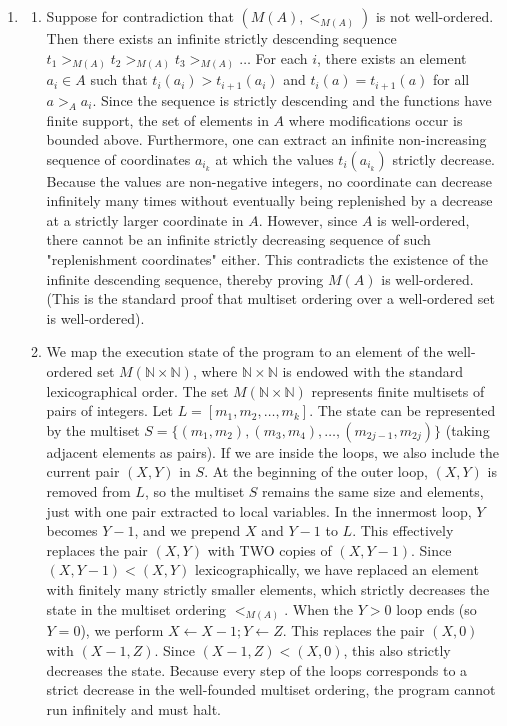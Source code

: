 \documentclass{article}
\begin{document}
\begin{enumerate}[label=\fbox{\arabic*}]
  \item %
        \begin{enumerate}[label=(\arabic*)]
          \item Suppose for contradiction that $(M(A), <_{M(A)})$ is not well-ordered. Then there exists an infinite strictly descending sequence $t_1 >_{M(A)} t_2 >_{M(A)} t_3 >_{M(A)} \dots$
                For each $i$, there exists an element $a_i \in A$ such that $t_i(a_i) > t_{i+1}(a_i)$ and $t_i(a) = t_{i+1}(a)$ for all $a >_A a_i$.
                Since the sequence is strictly descending and the functions have finite support, the set of elements in $A$ where modifications occur is bounded above.
                Furthermore, one can extract an infinite non-increasing sequence of coordinates $a_{i_k}$ at which the values $t_i(a_{i_k})$ strictly decrease. Because the values are non-negative integers, no coordinate can decrease infinitely many times without eventually being replenished by a decrease at a strictly larger coordinate in $A$. However, since $A$ is well-ordered, there cannot be an infinite strictly decreasing sequence of such "replenishment coordinates" either. This contradicts the existence of the infinite descending sequence, thereby proving $M(A)$ is well-ordered. (This is the standard proof that multiset ordering over a well-ordered set is well-ordered).
          \item We map the execution state of the program to an element of the well-ordered set $M(\mathbb{N} \times \mathbb{N})$, where $\mathbb{N} \times \mathbb{N}$ is endowed with the standard lexicographical order. The set $M(\mathbb{N} \times \mathbb{N})$ represents finite multisets of pairs of integers.
                Let $L = [m_1, m_2, \dots, m_k]$. The state can be represented by the multiset $S = \{ (m_1, m_2), (m_3, m_4), \dots, (m_{2j-1}, m_{2j}) \}$ (taking adjacent elements as pairs). If we are inside the loops, we also include the current pair $(X, Y)$ in $S$.
                At the beginning of the outer loop, $(X, Y)$ is removed from $L$, so the multiset $S$ remains the same size and elements, just with one pair extracted to local variables.
                In the innermost loop, $Y$ becomes $Y-1$, and we prepend $X$ and $Y-1$ to $L$. This effectively replaces the pair $(X, Y)$ with TWO copies of $(X, Y-1)$.
                Since $(X, Y-1) < (X, Y)$ lexicographically, we have replaced an element with finitely many strictly smaller elements, which strictly decreases the state in the multiset ordering $<_{M(A)}$.
                When the $Y > 0$ loop ends (so $Y = 0$), we perform $X \gets X-1; Y \gets Z$. This replaces the pair $(X, 0)$ with $(X-1, Z)$. Since $(X-1, Z) < (X, 0)$, this also strictly decreases the state.
                Because every step of the loops corresponds to a strict decrease in the well-founded multiset ordering, the program cannot run infinitely and must halt.
        \end{enumerate}


\end{enumerate}
\end{document}
